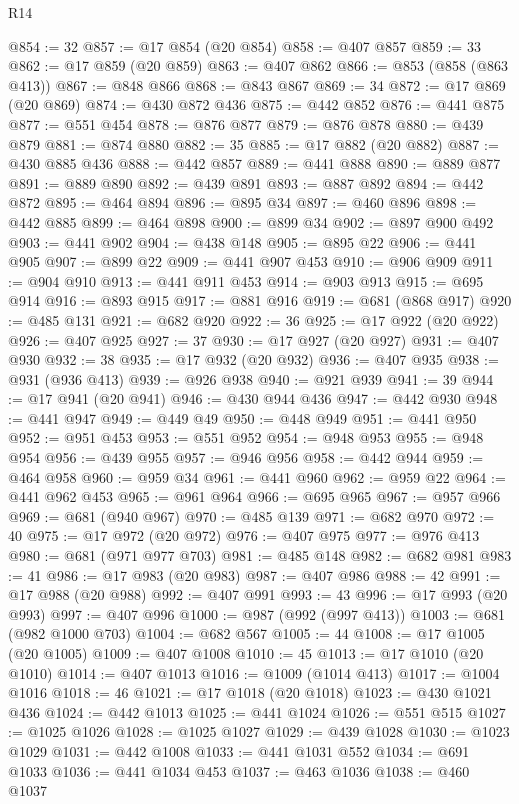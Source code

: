 \begin{lexlean}{R14}
\begin{coremodule}
@854 := 32
@857 := @17 @854 (@20 @854)
@858 := @407 @857
@859 := 33
@862 := @17 @859 (@20 @859)
@863 := @407 @862
@866 := @853 (@858 (@863 @413))
@867 := @848 @866
@868 := @843 @867
@869 := 34
@872 := @17 @869 (@20 @869)
@874 := @430 @872 @436
@875 := @442 @852
@876 := @441 @875
@877 := @551 @454
@878 := @876 @877
@879 := @876 @878
@880 := @439 @879
@881 := @874 @880
@882 := 35
@885 := @17 @882 (@20 @882)
@887 := @430 @885 @436
@888 := @442 @857
@889 := @441 @888
@890 := @889 @877
@891 := @889 @890
@892 := @439 @891
@893 := @887 @892
@894 := @442 @872
@895 := @464 @894
@896 := @895 @34
@897 := @460 @896
@898 := @442 @885
@899 := @464 @898
@900 := @899 @34
@902 := @897 @900 @492
@903 := @441 @902
@904 := @438 @148
@905 := @895 @22
@906 := @441 @905
@907 := @899 @22
@909 := @441 @907 @453
@910 := @906 @909
@911 := @904 @910
@913 := @441 @911 @453
@914 := @903 @913
@915 := @695 @914
@916 := @893 @915
@917 := @881 @916
@919 := @681 (@868 @917)
@920 := @485 @131
@921 := @682 @920
@922 := 36
@925 := @17 @922 (@20 @922)
@926 := @407 @925
@927 := 37
@930 := @17 @927 (@20 @927)
@931 := @407 @930
@932 := 38
@935 := @17 @932 (@20 @932)
@936 := @407 @935
@938 := @931 (@936 @413)
@939 := @926 @938
@940 := @921 @939
@941 := 39
@944 := @17 @941 (@20 @941)
@946 := @430 @944 @436
@947 := @442 @930
@948 := @441 @947
@949 := @449 @49
@950 := @448 @949
@951 := @441 @950
@952 := @951 @453
@953 := @551 @952
@954 := @948 @953
@955 := @948 @954
@956 := @439 @955
@957 := @946 @956
@958 := @442 @944
@959 := @464 @958
@960 := @959 @34
@961 := @441 @960
@962 := @959 @22
@964 := @441 @962 @453
@965 := @961 @964
@966 := @695 @965
@967 := @957 @966
@969 := @681 (@940 @967)
@970 := @485 @139
@971 := @682 @970
@972 := 40
@975 := @17 @972 (@20 @972)
@976 := @407 @975
@977 := @976 @413
@980 := @681 (@971 @977 @703)
@981 := @485 @148
@982 := @682 @981
@983 := 41
@986 := @17 @983 (@20 @983)
@987 := @407 @986
@988 := 42
@991 := @17 @988 (@20 @988)
@992 := @407 @991
@993 := 43
@996 := @17 @993 (@20 @993)
@997 := @407 @996
@1000 := @987 (@992 (@997 @413))
@1003 := @681 (@982 @1000 @703)
@1004 := @682 @567
@1005 := 44
@1008 := @17 @1005 (@20 @1005)
@1009 := @407 @1008
@1010 := 45
@1013 := @17 @1010 (@20 @1010)
@1014 := @407 @1013
@1016 := @1009 (@1014 @413)
@1017 := @1004 @1016
@1018 := 46
@1021 := @17 @1018 (@20 @1018)
@1023 := @430 @1021 @436
@1024 := @442 @1013
@1025 := @441 @1024
@1026 := @551 @515
@1027 := @1025 @1026
@1028 := @1025 @1027
@1029 := @439 @1028
@1030 := @1023 @1029
@1031 := @442 @1008
@1033 := @441 @1031 @552
@1034 := @691 @1033
@1036 := @441 @1034 @453
@1037 := @463 @1036
@1038 := @460 @1037

\end{coremodule}
\end{lexlean}
